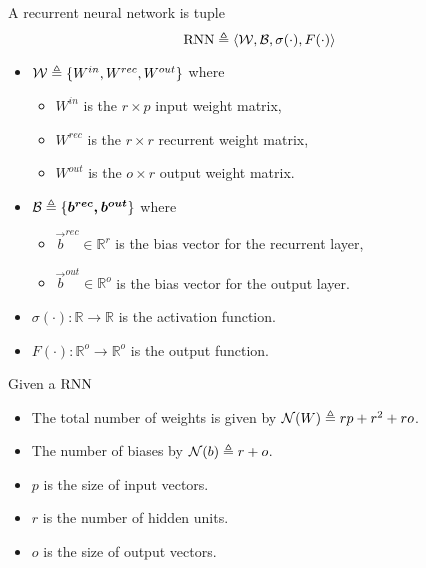 \begin{defn}
\label{def_rnn}
A recurrent  neural network is tuple
$$\mathrm{RNN}\triangleq\langle \mathcal{W},\mathcal{B} ,\sigma(\cdot),F(\cdot)\rangle$$
\begin{itemize}
 \item $\mathcal{W} \triangleq \{W^{in},W^{rec},W^{out}\}$ where
 \begin{itemize}
  \item $W^{in}$ is the $r\times p$ input weight matrix,
  \item $W^{rec}$ is the $r\times r$ recurrent weight matrix,
  \item $W^{out}$ is the $o \times r$ output weight matrix.
 \end{itemize}
 \item $\mathcal{B} \triangleq \{\boldsymbol{b^{rec},\boldsymbol{b^{out}}}\}$ where
 \begin{itemize}
   \item $\vec{b}^{rec} \in \mathbb{R}^{r}$ is the bias vector for the recurrent layer,
   \item $\vec{b}^{out} \in \mathbb{R}^{o}$ is the bias vector for the output layer.
 \end{itemize}
 \item $\sigma(\cdot): \mathbb{R}\rightarrow \mathbb{R}$ is the activation function.
 \item $F(\cdot): \mathbb{R}^{o}\rightarrow \mathbb{R}^{o}$ is the output function.
\end{itemize}
\end{defn}

\begin{remark}{}
Given a $\mathrm{RNN}$
\begin{itemize}
 \item The total number of weights is given by $\mathcal{N}(W) \triangleq rp+r^2+ro$.
 \item The number of biases by $\mathcal{N}(b) \triangleq r+o $.
 \item $p$ is the size of input vectors.
 \item$r$ is the number of hidden units.
 \item $o$ is the size of output vectors. 
\end{itemize}
\end{remark}

